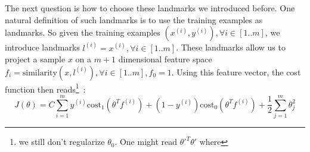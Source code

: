 \documentclass[10pt,a4paper]{article}
\begin{document}
The next question is how to choose these landmarks we introduced
before. One natural definition of such landmarks is to use the
training examples as landmarks. So given the training examples
$(x^{(i)}, y^{(i)}), \forall i\in[1..m]$, we introduce landmarks $l^{(i)} =
x^{(i)}, \forall i \in [1..m]$. These landmarks allow us to project a
sample $x$ on a $m+1$ dimensional feature space $f_i =
\mathrm{similarity}(x, l^{(i)}), \forall i \in [1..m], f_0 = 1$. Using
this feature vector, the cost function then reads\footnote{we still
  don't regularize $\theta_0$. One might read $\theta'^T\theta'$ where }~:
\begin{equation}
J(\theta) = C \sum_{i=1}^m y^{(i)} \mathrm{cost}_1 (\theta^T f^{(i)})
+ (1-y^{(i)}) \mathrm{cost}_0(\theta^T f^{(i)}) + \frac{1}{2}
\sum_{j=1}^m \theta_j^2
\end{equation}
\end{document}
